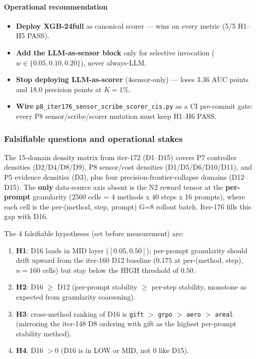 \documentclass{article}
\begin{document}
\paragraph{Operational recommendation}
\begin{itemize}
\item \textbf{Deploy XGB-24full} as canonical scorer --- wins on every metric (5/5 H1--H5 PASS).
\item \textbf{Add the LLM-as-sensor block} only for selective invocation ($w \in \{0.05, 0.10, 0.20\}$), never always-LLM.
\item \textbf{Stop deploying LLM-as-scorer} (4sensor-only) --- loses 3.36 AUC points and 18.0 precision points at $K{=}1\%$.
\item \textbf{Wire} \texttt{p8\_iter176\_sensor\_scribe\_scorer\_cis.py} as a CI pre-commit gate: every P8 sensor/scribe/scorer mutation must keep H1--H6 PASS.
\end{itemize} 

\subsubsection{Falsifiable questions and operational stakes}\label{sec:synth-iter176-sixteen-domain}
The 15-domain density matrix from iter-172 (D1--D15) covers
P7 controller densities (D2/D4/D8/D9), P8 sensor/cost densities
(D1/D5/D6/D10/D11), and P5 evidence densities (D3), plus four
precision-frontier-collapse domains (D12--D15). The \textbf{only}
data-source axis absent is the N2 reward tensor at the
\textbf{per-prompt} granularity (2560 cells = 4 methods x 40 steps x
16 prompts), where each cell is the per-(method, step, prompt) G=8
rollout batch. Iter-176 fills this gap with D16.

The 4 falsifiable hypotheses (set before measurement) are:
\begin{enumerate}
\item \textbf{H1}: D16 lands in MID layer ($[0.05, 0.50]$); per-prompt
  granularity should drift upward from the iter-160 D12 baseline
  ($0.175$ at per-(method, step), $n{=}160$ cells) but stay below
  the HIGH threshold of $0.50$.
\item \textbf{H2}: D16 $\ge$ D12 (per-prompt stability $\ge$ per-step stability,
  monotone as expected from granularity coarsening).
\item \textbf{H3}: cross-method ranking of D16 is
  \texttt{gift} $>$ \texttt{grpo} $>$ \texttt{aero} $>$ \texttt{areal}
  (mirroring the iter-148 D8 ordering with gift as the highest
  per-prompt stability method).
\item \textbf{H4}: D16 $> 0$ (D16 is in LOW or MID, not $0$ like D15).
\end{enumerate}
\end{document}
